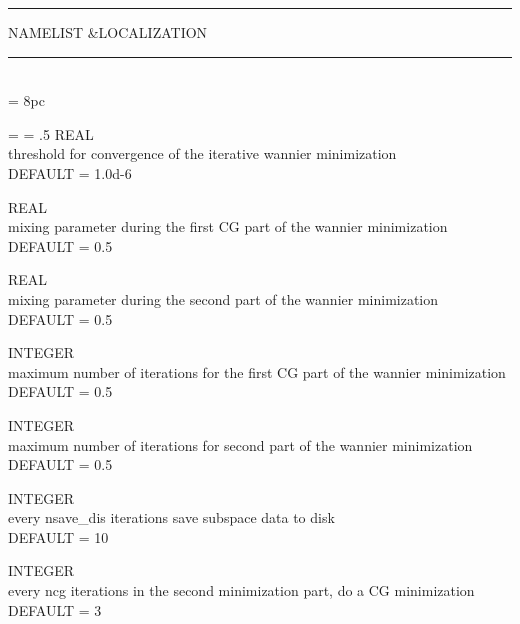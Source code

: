 \begin{centering}
\rule{2.2in}{0.01in} NAMELIST \&LOCALIZATION \rule{2.2in}{0.01in}
\end{centering}\\

\newdimen\descindent \descindent = 8pc
{\noindent \leftskip = \descindent \parskip = .5\baselineskip
{}%
REAL \\ threshold for convergence of the iterative wannier minimization
\\ DEFAULT = 1.0d-6 \par

\noindent{}%
REAL \\ mixing parameter during the first CG part of the wannier minimization\\ DEFAULT = 0.5 \par

\noindent{}%
REAL \\ mixing parameter during the second part of the wannier minimization\\ DEFAULT = 0.5 \par

\noindent{}%
INTEGER \\ maximum number of iterations for the first CG part of the wannier minimization\\ DEFAULT = 0.5 \par

\noindent{}%
INTEGER \\ maximum number of iterations for second part of the wannier minimization\\ DEFAULT = 0.5 \par

\noindent{}%
INTEGER \\ every nsave\_dis iterations save subspace data to disk\\ DEFAULT = 10 \par

\noindent{}%
INTEGER \\ every ncg iterations in the second minimization part, do a CG minimization\\ DEFAULT = 3 \par

}
